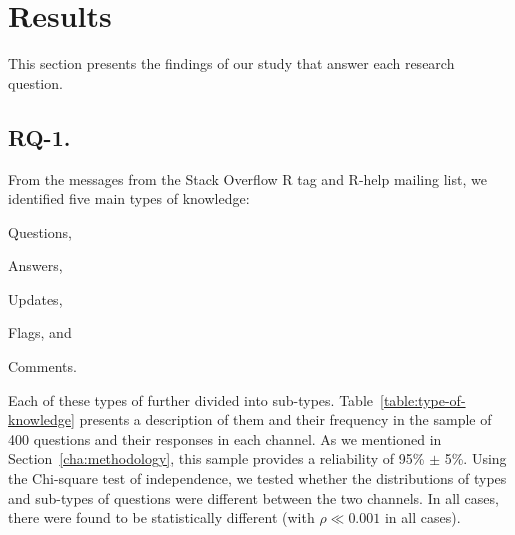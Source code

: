 \section{Results}
\label{cha:findings}

This section presents the findings of our study that answer each research question.

\subsection{RQ-1. \rqa}
\label{cha:findings-types}

From the messages from the Stack Overflow R tag and R-help mailing list,  we identified five main types of knowledge:
\begin{enumerate*}[label=(\arabic*)]
\item Questions,
\item Answers,
\item Updates,
\item Flags, and
\item Comments.
\end{enumerate*}
Each of these types of further divided into sub-types. Table~\ref{table:type-of-knowledge} presents a description of them and their frequency in the sample of
400 questions and their responses in each channel. As we mentioned in Section~\ref{cha:methodology}, this sample provides a reliability of 95\% $\pm$ 5\%. Using
the Chi-square test of independence, we tested whether the distributions of types and sub-types of questions were different between the two channels.  In
all cases, there were found to be statistically different (with $\rho \ll 0.001$ in all cases).
